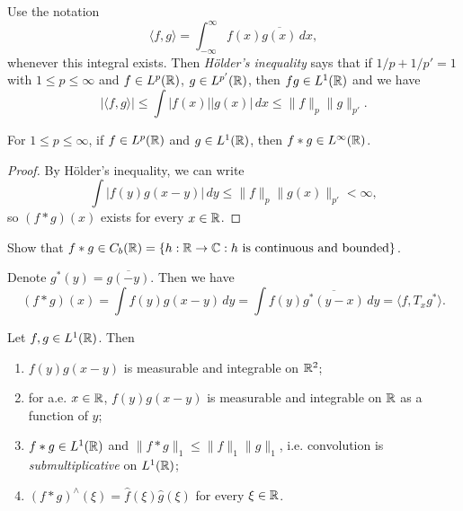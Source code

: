 \begin{remark}
  Use the notation
  \[
    \langle f, g \rangle
    = \int_{-\infty}^\infty
    f(x) \overline{g(x)}\, dx,
  \]
  whenever this integral exists.
  Then \emph{H\"older's inequality}
  says that if $1 / p + 1 / p' = 1$
  with $1 \le p \le \infty$ and
  $f \in L^p(\mathbb{R})$, $g \in L^{p'}(\mathbb{R})$,
  then $fg \in L^1(\mathbb{R})$ and we have
  \[
    |\langle f, g \rangle|
    \le \int |f(x)| |g(x)|\, dx
    \le \|f\|_p \|g\|_{p'}.
  \]
\end{remark}

\begin{theorem}
  For $1 \le p \le \infty$, if
  $f \in L^p(\mathbb{R})$ and
  $g \in L^1(\mathbb{R})$, then
  $f * g \in L^\infty(\mathbb{R})$.
\end{theorem}

\begin{proof}
  By H\"older's inequality, we can write
  \[
    \int |f(y) g(x - y)|\, dy
    \le \|f\|_p \|g(x)\|_{p'}
    < \infty,
  \]
  so $(f * g)(x)$ exists for every $x \in \mathbb{R}$.
\end{proof}

\begin{exercise}
  Show that $f * g \in C_b(\mathbb{R}) = \{h : \mathbb{R} \to \mathbb{C} : h \text{ is continuous and bounded}\}$.
\end{exercise}

\begin{remark}
  Denote $g^*(y) = \overline{g(-y)}$. Then
  we have
  \[
    (f * g)(x)
    = \int f(y) g(x - y)\, dy
    = \int f(y) \overline{g^*(y - x)}\, dy
    = \langle f, T_x g^* \rangle.
  \]
\end{remark}

\begin{theorem}
  Let $f, g \in L^1(\mathbb{R})$. Then
  \begin{enumerate}
    \item $f(y) g(x - y)$ is measurable
      and integrable on $\mathbb{R}^2$;
    \item for a.e. $x \in \mathbb{R}$,
      $f(y) g(x - y)$ is measurable
      and integrable on $\mathbb{R}$ as a
      function of $y$;
    \item $f * g \in L^1(\mathbb{R})$ and
      $\|f * g\|_1 \le \|f\|_1 \|g\|_1$, i.e.
      convolution is
      \emph{submultiplicative} on $L^1(\mathbb{R})$;
    \item $(f * g)^\wedge(\xi) = \widehat{f}(\xi) \widehat{g}(\xi)$ for every $\xi \in \mathbb{R}$.
  \end{enumerate}
\end{theorem}

